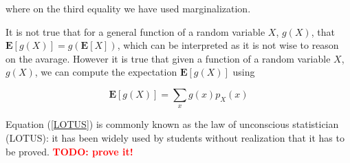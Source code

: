 \documentclass[12pt]{article}
\begin{document}
\noindent
where on the third equality we have used marginalization.

It is not true that for a general function of a random variable $X$, $g(X)$, that
$
\mathbf{E} \left[ g(X) \right] = 
g \left( \mathbf{E} \left[ X \right] \right)
$, which can be interpreted as it is not wise to reason on the avarage.
However it is true that given a function of a random variable $X$, $g(X)$, we can compute the expectation
$\mathbf{E} [ g(X) ] $ using

\begin{equation} \label{LOTUS}
\mathbf{E} \left[ g(X) \right] = \sum_{x} g(x) p_{X} (x)
\end{equation}

\noindent
Equation (\ref{LOTUS}) is commonly known as the law of 
unconscious statistician (LOTUS): it has been widely used by 
students without realization that it has to be proved. 
\textcolor{red}{\textbf{TODO: prove it!}}
%
%
%
%
%
%
%
\end{document}
